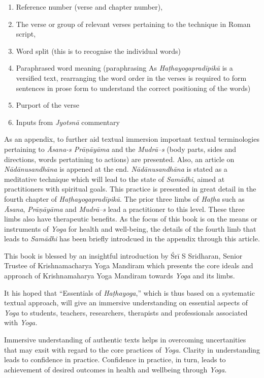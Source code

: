 \begin{enumerate}
\item Reference number (verse and chapter number),
\item The verse or group of relevant verses pertaining to the technique in Roman script,
\item Word split (this is to recognise the individual words)
\item Paraphrased word meaning (paraphrasing As \textit{Haṭhayogapradīpikā} is a versified text, rearranging the word order in the verses is required to form sentences in prose form to understand the correct positioning of the words)
\item Purport of the verse 
\item Inputs from \textit{Jyotsnā} commentary
\end{enumerate}

As an appendix, to further aid textual immersion important textual terminologies pertaining to \textit{Āsana-s Prāṇāyāma} and the \textit{Mudrā–s} (body parts, sides and directions, words pertatining to actions) are presented. Also, an article on \textit{Nādānusandhāna} is appened at the end. \textit{Nādānusandhāna} is stated as a meditative technique which will lead to the state of \textit{Samādhi}, aimed at practitioners with spiritual goals. This practice is presented in great detail in the fourth chapter of \textit{Haṭhayogapradīpikā}. The prior three limbs of \textit{Haṭha} such as \textit{Āsana}, \textit{Prāṇāyāma} and \textit{Mudrā–s} lead a practitioner to this level. These three limbs also have therapeutic benefits. As the focus of this book is on the means or instruments of \textit{Yoga} for health and well-being, the details of the fourth limb that leads to \textit{Samādhi} has been briefly introdcued in the appendix through this article.

This book is blessed by an insightful introduction by Śrī S Sridharan, Senior Trustee of Krishnamacharya Yoga Mandiram which presents the core ideals and approach of Krishnamaharya Yoga Mandiram towards \textit{Yoga} and its limbs.

It his hoped that “Essentials of \textit{Haṭhayoga},” which is thus based on a systematic textual approach, will give an immersive understanding on essential aspects of \textit{Yoga} to students, teachers, researchers, therapists and professionals associated with \textit{Yoga.}

Immersive understanding of authentic texts helps in overcoming uncertanities that may exsit with regard to the core practices of \textit{Yoga.} Clarity in understanding leads to confidence in practice. Confidence in practice, in turn, leads to achievement of desired outcomes in health and wellbeing through \textit{Yoga}. 

